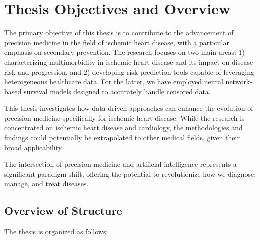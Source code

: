 \chapter{Thesis Objectives and Overview} \label{intro}

The primary objective of this thesis is to contribute to the advancement of
precision medicine in the field of ischemic heart disease, with a particular
emphasis on secondary prevention. The research focuses on two main areas: 1)
characterizing multimorbidity in ischemic heart disease and its impact on
disease risk and progression, and 2) developing risk-prediction tools capable
of leveraging heterogeneous healthcare data. For the latter, we have employed
neural network-based survival models designed to accurately handle censored
data.

This thesis investigates how data-driven approaches can enhance the evolution
of precision medicine specifically for ischemic heart disease. While the
research is concentrated on ischemic heart disease and cardiology, the
methodologies and findings could potentially be extrapolated to other medical
fields, given their broad applicability.

The intersection of precision medicine and artificial intelligence represents a
significant paradigm shift, offering the potential to revolutionize how we
diagnose, manage, and treat diseases.

\section{Overview of Structure}

The thesis is organized as follows:

